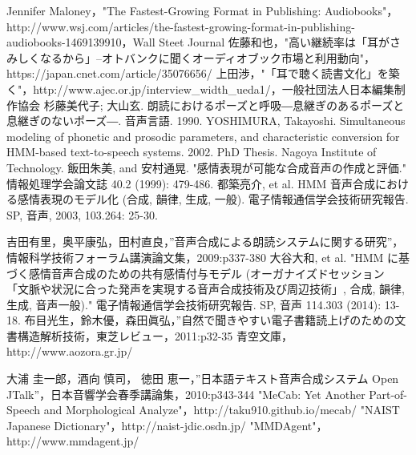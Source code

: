 \begin{thebibliography}{99}

 Jennifer Maloney，"The Fastest-Growing Format in Publishing: Audiobooks"，http://www.wsj.com/articles/the-fastest-growing-format-in-publishing-audiobooks-1469139910，Wall Steet Journal
 佐藤和也，"高い継続率は「耳がさみしくなるから」--オトバンクに聞くオーディオブック市場と利用動向"，https://japan.cnet.com/article/35076656/
 上田渉，"「耳で聴く読書文化」を築く"，http://www.ajec.or.jp/interview\_width\_ueda1/，一般社団法人日本編集制作協会
 杉藤美代子; 大山玄. 朗読におけるポーズと呼吸―息継ぎのあるポーズと息継ぎのないポーズ―. 音声言語. 1990.
 YOSHIMURA, Takayoshi. Simultaneous modeling of phonetic and prosodic parameters, and characteristic conversion for HMM-based text-to-speech systems. 2002. PhD Thesis. Nagoya Institute of Technology.
 飯田朱美, and 安村通晃. "感情表現が可能な合成音声の作成と評価." 情報処理学会論文誌 40.2 (1999): 479-486.
 都築亮介, et al. HMM 音声合成における感情表現のモデル化 (合成, 韻律, 生成, 一般). 電子情報通信学会技術研究報告. SP, 音声, 2003, 103.264: 25-30.

 吉田有里，奥平康弘，田村直良，”音声合成による朗読システムに関する研究”，情報科学技術フォーラム講演論文集，2009:p337-380
 大谷大和, et al. "HMM に基づく感情音声合成のための共有感情付与モデル (オーガナイズドセッション 「文脈や状況に合った発声を実現する音声合成技術及び周辺技術」, 合成, 韻律, 生成, 音声一般)." 電子情報通信学会技術研究報告. SP, 音声 114.303 (2014): 13-18.
 布目光生，鈴木優，森田眞弘，”自然で聞きやすい電子書籍読上げのための文書構造解析技術，東芝レビュー，2011:p32-35
 青空文庫，http://www.aozora.gr.jp/

 大浦 圭一郎，酒向 慎司， 徳田 恵一，”日本語テキスト音声合成システム Open JTalk”，日本音響学会春季講論集，2010:p343-344
 "MeCab: Yet Another Part-of-Speech and Morphological Analyze"，http://taku910.github.io/mecab/
 "NAIST Japanese Dictionary"，http://naist-jdic.osdn.jp/
 "MMDAgent"，http://www.mmdagent.jp/


\end{thebibliography}
